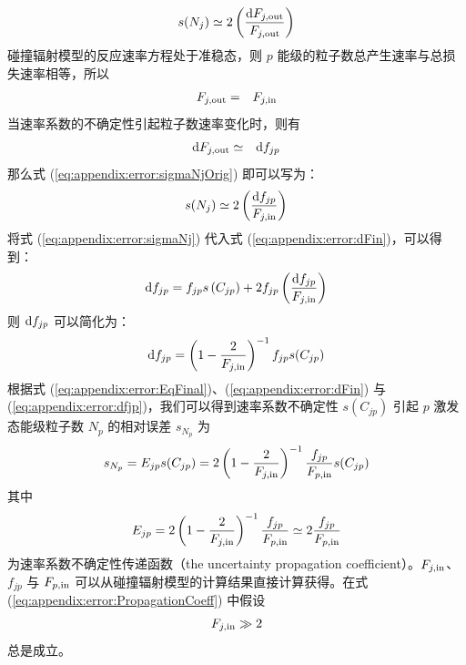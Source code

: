 \begin{eqnarray}
s(N_j)\simeq 2\left(\frac{{\rm d}F_{j,{\rm out}}}{F_{j,{\rm out}}}\right)
\label{eq:appendix:error:sigmaNjOrig}
\end{eqnarray}
碰撞辐射模型的反应速率方程处于准稳态，则 $p$ 能级的粒子数总产生速率与总损失速率相等，所以
\begin{eqnarray}
F_{j,{\rm out}}&=&F_{j,{\rm in}}
\label{eq:appendix:error:FjinANDdFjin}
\end{eqnarray}
当速率系数的不确定性引起粒子数速率变化时，则有
\begin{eqnarray}
{\rm d}F_{j,{\rm out}}&\simeq&{\rm d}f_{jp}
\label{eq:appendix:error:dFjinANDdFjin}
\end{eqnarray}
那么式 (\ref{eq:appendix:error:sigmaNjOrig}) 即可以写为：
\begin{eqnarray}
s(N_j)\simeq 2\left(\frac{{\rm d}f_{jp}}{F_{j,{\rm in}}}\right)
\label{eq:appendix:error:sigmaNj}
\end{eqnarray}
将式 (\ref{eq:appendix:error:sigmaNj}) 代入式 (\ref{eq:appendix:error:dFin})，可以得到：
\begin{eqnarray}
{\rm d}f_{jp}=f_{jp}s\left(C_{jp}\right)+2f_{jp}\left(\frac{{\rm d}f_{jp}}{F_{j,{\rm in}}}\right)
\label{eq:appendix:error:dfjpEq}
\end{eqnarray}
则 ${\rm d}f_{jp}$ 可以简化为：
\begin{eqnarray}
{\rm d}f_{jp}=\left(1-\frac{2}{F_{j,{\rm in}}}\right)^{-1}f_{jp}s(C_{jp})
\label{eq:appendix:error:dfjp}
\end{eqnarray}
根据式 (\ref{eq:appendix:error:EqFinal})、(\ref{eq:appendix:error:dFin}) 与 (\ref{eq:appendix:error:dfjp})，我们可以得到速率系数不确定性 $s(C_{jp})$ 引起 $p$ 激发态能级粒子数 $N_p$ 的相对误差 $s_{N_p}$ 为
\begin{eqnarray}
s_{N_p}=E_{jp}s(C_{jp})=2\left(1-\frac{2}{F_{j,{\rm in}}}\right)^{-1}\frac{f_{jp}}{F_{p,{\rm in}}}s(C_{jp})
\label{eq:appendix:error:Propagation}
\end{eqnarray}
其中
\begin{eqnarray}
E_{jp}=2\left(1-\frac{2}{F_{j,{\rm in}}}\right)^{-1}\frac{f_{jp}}{F_{p,{\rm in}}}
\simeq 2\frac{f_{jp}}{F_{p,{\rm in}}}
\label{eq:appendix:error:PropagationCoeff}
\end{eqnarray}
为速率系数不确定性传递函数（the uncertainty propagation coefficient）。$F_{j,{\rm in}}$、$f_{jp}$ 与 $F_{p,{\rm in}}$ 可以从碰撞辐射模型的计算结果直接计算获得。在式(\ref{eq:appendix:error:PropagationCoeff}) 中假设
\begin{eqnarray}
F_{j,{\rm in}}\gg 2
\label{eq:appendix:error:FjinLargerThan2}
\end{eqnarray}
总是成立。

